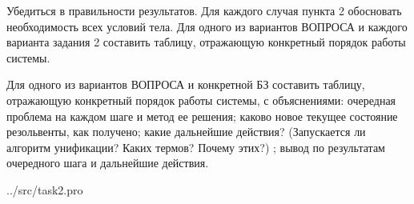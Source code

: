 Убедиться в правильности результатов.
Для каждого случая пункта 2 обосновать необходимость всех условий тела.
Для одного из вариантов ВОПРОСА и каждого варианта задания 2 составить
таблицу, отражающую конкретный порядок работы системы.

Для одного из вариантов ВОПРОСА и конкретной БЗ составить таблицу, отражающую
конкретный порядок работы системы, с объяснениями: очередная проблема на каждом шаге
и метод ее решения; каково новое текущее состояние резольвенты, как получено; какие
дальнейшие   действия?   (Запускается   ли   алгоритм   унификации?   Каких   термов?   Почему
этих?) ; вывод по результатам очередного шага и дальнейшие действия.

\begin{lstinputlisting}[
	label={lst:t1},
	]{../src/task2.pro}
\end{lstinputlisting}

